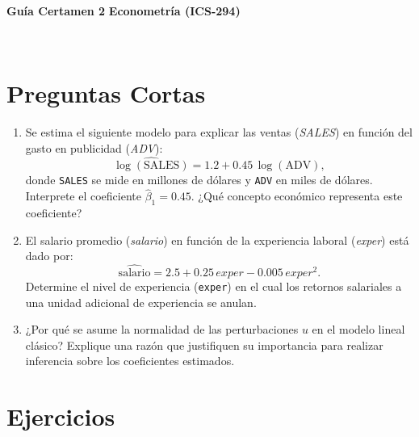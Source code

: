 \documentclass[10pt,a4paper]{article}
\begin{document}
\vspace{5cm}



\begin{center}
\begin{large}
\textbf{\\Gu\'ia Certamen 2}
\textbf{Econometría (ICS-294)}
\end{large}\\
\end{center}


\section{Preguntas Cortas}

\begin{enumerate}
    \item Se estima el siguiente modelo para explicar las ventas (\emph{SALES})
        en función del gasto en publicidad (\emph{ADV}):
        \[
          \widehat{\log(\text{SALES})}
          = 1.2 + 0.45\,\log(\text{ADV}) ,
        \]
        donde \texttt{SALES} se mide en millones de dólares y \texttt{ADV}
        en miles de dólares. Interprete el coeficiente \(\hat{\beta}_1 = 0.45\). ¿Qué concepto económico representa este coeficiente?\\

    
        
\item El salario promedio (\emph{salario}) en función de la experiencia laboral
        (\emph{exper}) está dado por:
        \[
          \widehat{\text{salario}}
          = 2.5 + 0.25\,exper - 0.005\,exper^2 .
        \]
        Determine el nivel de experiencia (\texttt{exper}) en el cual los
                retornos salariales a una unidad adicional de experiencia
                se anulan.
 \\
 

\item ¿Por qué se asume la normalidad de las perturbaciones \(u\)
        en el modelo lineal clásico? Explique una razón   que justifiquen su importancia para realizar inferencia
        sobre los coeficientes estimados.
        \\

\end{enumerate}

\section{Ejercicios}
\end{document}
